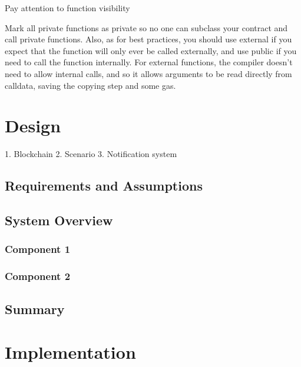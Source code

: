 Pay attention to function visibility

Mark all private functions as private so no one can subclass your contract and call private functions. Also, as for best practices, you should use external if you expect that the function will only ever be called externally, and use public if you need to call the function internally. For external functions, the compiler doesn’t need to allow internal calls, and so it allows arguments to be read directly from calldata, saving the copying step and some gas.

\chapter{Design}
\label{ch:design}


1. Blockchain
2. Scenario
3. Notification system

\section{Requirements and Assumptions}

\section{System Overview}

\subsection{Component 1}

\subsection{Component 2}

\section{Summary}

\chapter{Implementation}

